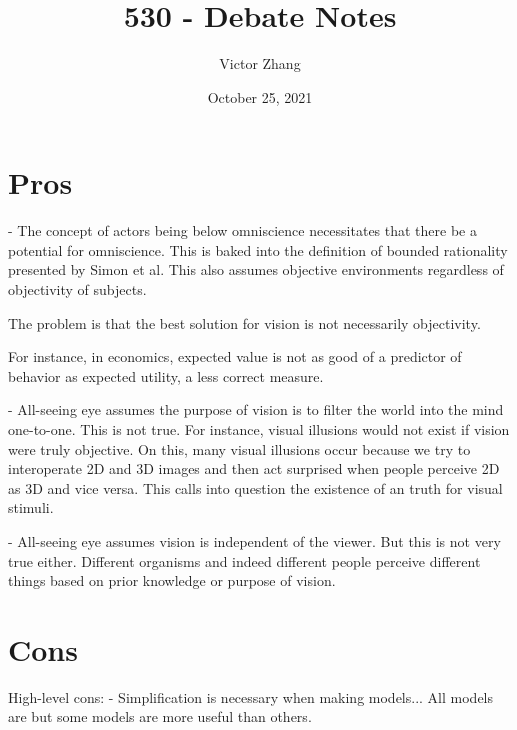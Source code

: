 \documentclass{article}
\title{530 - Debate Notes}
\author{Victor Zhang}
\date{October 25, 2021}
\newenvironment{myindentpar}[1]
  {\begin{list}{}
          {
            \setlength{\leftmargin}{#1}
            \setlength{\rightmargin}{#1}
          }
          \item[]
  }
  {\end{list}}
\begin{document}
\maketitle

\section{Pros}
- The concept of actors being below omniscience necessitates that there be a potential for omniscience. This is baked into the definition of bounded rationality presented by Simon et al. This also assumes objective environments regardless of objectivity of subjects.

The problem is that the best solution for vision is not necessarily objectivity.
\begin{myindentpar}{1em}
For instance, in economics, expected value is not as good of a predictor of behavior as expected utility, a less  correct measure.
\end{myindentpar}

- All-seeing eye assumes the purpose of vision is to filter the world into the mind one-to-one. This is not true. For instance, visual illusions would not exist if vision were truly objective. On this, many visual illusions occur because we try to interoperate 2D and 3D images and then act surprised when people perceive 2D as 3D and vice versa. This calls into question the existence of an  truth for visual stimuli.

- All-seeing eye assumes vision is independent of the viewer. But this is not very true either. Different organisms and indeed different people perceive different things based on prior knowledge or purpose of vision.

\section{Cons}
High-level cons:
- Simplification is necessary when making models... All models are  but some models are more useful than others.
\end{document}
